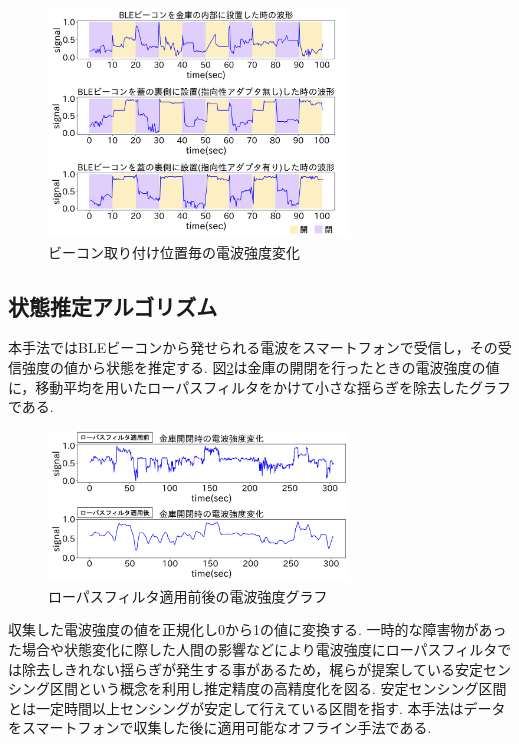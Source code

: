 \documentclass[Japanese]{dicomopapers}
\begin{document}
\begin{figure}[h]
    \centering
    \includegraphics[width=8cm]{in-out.png}
    \caption{ビーコン取り付け位置毎の電波強度変化}
    \label{transform-data}
\end{figure}



\subsection{状態推定アルゴリズム}
本手法ではBLEビーコンから発せられる電波をスマートフォンで受信し，その受信強度の値から状態を推定する.
図\ref{bank-opcl}は金庫の開閉を行ったときの電波強度の値に，移動平均を用いたローパスフィルタをかけて小さな揺らぎを除去したグラフである.

\begin{figure}[b]
 \centering
 \includegraphics[width=8cm]{lowpath_compare.png}
 \caption{ローパスフィルタ適用前後の電波強度グラフ}
 \label{bank-opcl}
\end{figure}

収集した電波強度の値を正規化し0から1の値に変換する.
一時的な障害物があった場合や状態変化に際した人間の影響などにより電波強度にローパスフィルタでは除去しきれない揺らぎが発生する事があるため，梶ら\cite{sensing-area}が提案している安定センシング区間という概念を利用し推定精度の高精度化を図る.
安定センシング区間とは一定時間以上センシングが安定して行えている区間を指す.
本手法はデータをスマートフォンで収集した後に適用可能なオフライン手法である.
\end{document}
